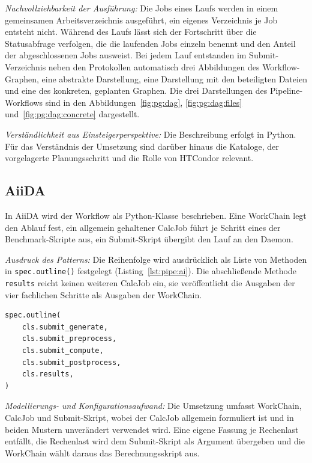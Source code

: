 \emph{Nachvollziehbarkeit der Ausführung:} Die Jobs eines Laufs
werden in einem gemeinsamen Arbeitsverzeichnis ausgeführt, ein
eigenes Verzeichnis je Job entsteht nicht. Während des Laufs lässt
sich der Fortschritt über die Statusabfrage verfolgen, die die
laufenden Jobs einzeln benennt und den Anteil der abgeschlossenen
Jobs ausweist. Bei jedem Lauf entstanden
im Submit-Verzeichnis neben den Protokollen automatisch drei
Abbildungen des Workflow-Graphen, eine abstrakte Darstellung, eine
Darstellung mit den beteiligten Dateien und eine des konkreten,
geplanten Graphen. Die drei Darstellungen des
Pipeline-Workflows sind in den Abbildungen~\ref{fig:pg:dag},
\ref{fig:pg:dag:files} und~\ref{fig:pg:dag:concrete} dargestellt.

\emph{Verständlichkeit aus Einsteigerperspektive:} Die Beschreibung
erfolgt in Python. Für das Verständnis der Umsetzung sind darüber
hinaus die Kataloge, der vorgelagerte
Planungsschritt und die Rolle von HTCondor relevant.

\subsection{AiiDA}
\label{sec:lokal:pipeline:aiida}

In AiiDA wird der Workflow als Python-Klasse beschrieben. Eine
WorkChain legt den Ablauf fest, ein allgemein gehaltener CalcJob
führt je Schritt eines der Benchmark-Skripte aus, ein Submit-Skript
übergibt den Lauf an den Daemon.

\emph{Ausdruck des Patterns:} Die Reihenfolge wird ausdrücklich als
Liste von Methoden in \texttt{spec.outline()} festgelegt (Listing~\ref{lst:pipe:ai}). Die
abschließende Methode \texttt{results} reicht keinen weiteren
CalcJob ein, sie veröffentlicht die Ausgaben der vier fachlichen
Schritte als Ausgaben der WorkChain.

\begin{lstlisting}[language=Python,caption={Reihenfolge in spec.outline() (AiiDA, Pipeline)},label={lst:pipe:ai}]
spec.outline(
    cls.submit_generate,
    cls.submit_preprocess,
    cls.submit_compute,
    cls.submit_postprocess,
    cls.results,
)
\end{lstlisting}

\emph{Modellierungs- und Konfigurationsaufwand:} Die Umsetzung
umfasst WorkChain, CalcJob und Submit-Skript, wobei der CalcJob
allgemein formuliert ist und in beiden Mustern unverändert verwendet
wird. Eine eigene Fassung je Rechenlast entfällt, die Rechenlast wird
dem Submit-Skript als Argument übergeben und die WorkChain wählt
daraus das Berechnungsskript aus.

